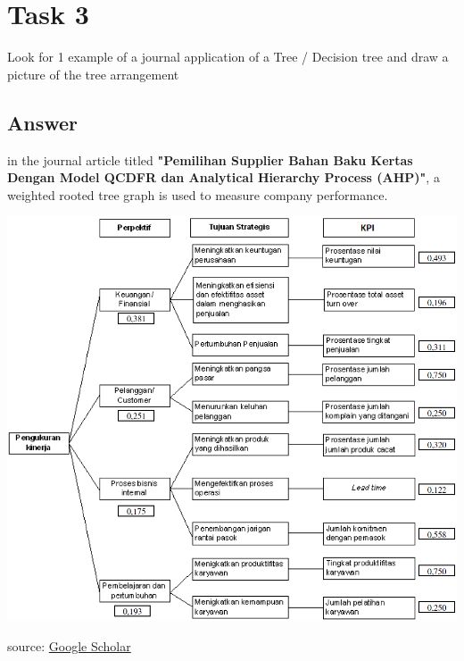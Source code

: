 \documentclass[12pt,titlepage]{article}
\begin{document}
\section*{Task 3}
Look for 1 example of a journal application of a Tree / Decision tree and draw a picture of the tree arrangement 

\subsection*{Answer}
in the journal article titled \textbf{"Pemilihan Supplier Bahan Baku Kertas Dengan Model QCDFR dan Analytical Hierarchy Process (AHP)"}, a weighted rooted tree graph is used to measure company performance. 

\includegraphics[width=.9\textwidth]{images/figures/fig11.png}

source: %
\href{https://scholar.google.com/citations?view_op=view_citation&hl=id&user=RWuenBkAAAAJ&cstart=20&pagesize=80&authuser=1&citation_for_view=RWuenBkAAAAJ:UeHWp8X0CEIC}{Google Scholar}
\end{document}
